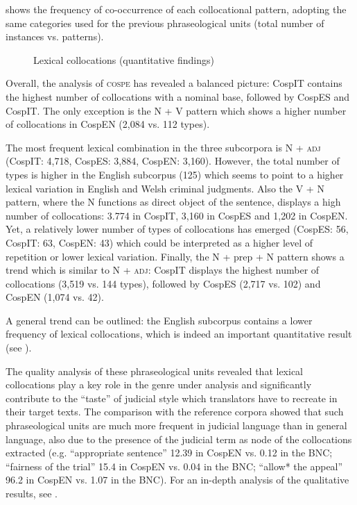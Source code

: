 \documentclass[output=paper]{LSP/langsci}
\begin{document}
 shows the frequency of co-occurrence of each collocational pattern, adopting the same categories used for the previous phraseological units (total number of instances vs. patterns).

\begin{figure}

\caption{Lexical collocations (quantitative findings)} \label{fig:6:3}
\end{figure}

Overall, the analysis of \textsc{cospe} has revealed a balanced picture: CospIT contains the highest number of collocations with a nominal base, followed by CospES and CospIT. The only exception is the N + V pattern which shows a higher number of collocations in CospEN (2,084 vs. 112 types).

The most frequent lexical combination in the three subcorpora is N + \textsc{adj} (CospIT: 4,718, CospES: 3,884, CospEN: 3,160). However, the total number of types is higher in the English subcorpus (125) which seems to point to a higher lexical variation in English and Welsh criminal judgments. Also the V + N pattern, where the N functions as direct object of the sentence, displays a high number of collocations: 3.774 in CospIT, 3,160 in CospES and 1,202 in CospEN. Yet, a relatively lower number of types of collocations has emerged (CospES: 56, CospIT: 63, CospEN: 43) which could be interpreted as a higher level of repetition or lower lexical variation. Finally, the N + prep + N pattern shows a trend which is similar to N + \textsc{adj}: CospIT displays the highest number of collocations (3,519 vs. 144 types), followed by CospES (2,717 vs. 102) and CospEN (1,074 vs. 42).

A general trend can be outlined: the English subcorpus contains a lower frequency of lexical collocations, which is indeed an important quantitative result (see ).

The quality analysis of these phraseological units revealed that lexical collocations play a key role in the genre under analysis and significantly contribute to the “taste” of judicial style which translators have to recreate in their target texts. The comparison with the reference corpora showed that such phraseological units are much more frequent in judicial language than in general language, also due to the presence of the judicial term as node of the collocations extracted (e.g. “appropriate sentence” 12.39 in CospEN vs. 0.12 in the BNC; “fairness of the trial” 15.4 in CospEN vs. 0.04 in the BNC; “allow* the appeal” 96.2 in CospEN vs. 1.07 in the BNC). For an in-depth analysis of the qualitative results, see \citep[241-252][]{Pontrandolfo2013a}.
\end{document}
